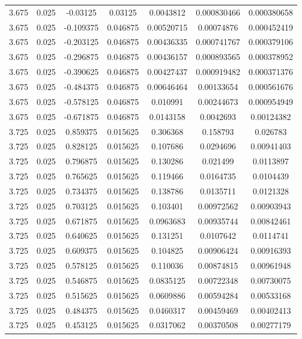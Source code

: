 \begin{flushleft}
\begin{longtable}{ccccccc}
3.675 & 0.025 & -0.03125 & 0.03125 & 0.0043812 & 0.000830466 & 0.000380658  \\ 
3.675 & 0.025 & -0.109375 & 0.046875 & 0.00520715 & 0.00074876 & 0.000452419  \\ 
3.675 & 0.025 & -0.203125 & 0.046875 & 0.00436335 & 0.000741767 & 0.000379106  \\ 
3.675 & 0.025 & -0.296875 & 0.046875 & 0.00436157 & 0.000893565 & 0.000378952  \\ 
3.675 & 0.025 & -0.390625 & 0.046875 & 0.00427437 & 0.000919482 & 0.000371376  \\ 
3.675 & 0.025 & -0.484375 & 0.046875 & 0.00646464 & 0.00133654 & 0.000561676  \\ 
3.675 & 0.025 & -0.578125 & 0.046875 & 0.010991 & 0.00244673 & 0.000954949  \\ 
3.675 & 0.025 & -0.671875 & 0.046875 & 0.0143158 & 0.0042693 & 0.00124382  \\ 
3.725 & 0.025 & 0.859375 & 0.015625 & 0.306368 & 0.158793 & 0.026783  \\ 
3.725 & 0.025 & 0.828125 & 0.015625 & 0.107686 & 0.0294696 & 0.00941403  \\ 
3.725 & 0.025 & 0.796875 & 0.015625 & 0.130286 & 0.021499 & 0.0113897  \\ 
3.725 & 0.025 & 0.765625 & 0.015625 & 0.119466 & 0.0164735 & 0.0104439  \\ 
3.725 & 0.025 & 0.734375 & 0.015625 & 0.138786 & 0.0135711 & 0.0121328  \\ 
3.725 & 0.025 & 0.703125 & 0.015625 & 0.103401 & 0.00972562 & 0.00903943  \\ 
3.725 & 0.025 & 0.671875 & 0.015625 & 0.0963683 & 0.00935744 & 0.00842461  \\ 
3.725 & 0.025 & 0.640625 & 0.015625 & 0.131251 & 0.0107642 & 0.0114741  \\ 
3.725 & 0.025 & 0.609375 & 0.015625 & 0.104825 & 0.00906424 & 0.00916393  \\ 
3.725 & 0.025 & 0.578125 & 0.015625 & 0.110036 & 0.00874815 & 0.00961948  \\ 
3.725 & 0.025 & 0.546875 & 0.015625 & 0.0835125 & 0.00722348 & 0.00730075  \\ 
3.725 & 0.025 & 0.515625 & 0.015625 & 0.0609886 & 0.00594284 & 0.00533168  \\ 
3.725 & 0.025 & 0.484375 & 0.015625 & 0.0460317 & 0.00459469 & 0.00402413  \\ 
3.725 & 0.025 & 0.453125 & 0.015625 & 0.0317062 & 0.00370508 & 0.00277179  \\ 

\end{longtable}
\end{flushleft}
